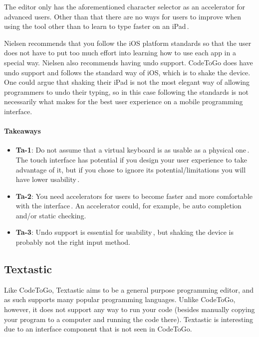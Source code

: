The editor only has the aforementioned character selector as an accelerator for advanced users. Other than that there are no ways for users to improve when using the tool other than to learn to type faster on an iPad\,\cite{nielsen1990heuristic}.

Nielsen recommends that you follow the iOS platform standards so that the user does not have to put too much effort into learning how to use each app in a special way. Nielsen also recommends having undo support. CodeToGo does have undo support and follows the standard way of iOS, which is to shake the device. One could argue that shaking their iPad is not the most elegant way of allowing programmers to undo their typing, so in this case following the standards is not necessarily what makes for the best user experience on a mobile programming interface.

\paragraph{Takeaways}
\begin{itemize}
	\item \textbf{Ta-1}: Do not assume that a virtual keyboard is as usable as a physical one\,\cite{nielsen2013mobile}. The touch interface has potential if you design your user experience to take advantage of it, but if you chose to ignore its potential/limitations you will have lower usability\,\cite{nielsen1990heuristic}.
	\item \textbf{Ta-2}: You need accelerators for users to become faster and more comfortable with the interface\,\cite{nielsen1990heuristic}. An accelerator could, for example, be auto completion and/or static checking.
	\item \textbf{Ta-3}: Undo support is essential for usability\,\cite{nielsen1990heuristic}, but shaking the device is probably not the right input method.
\end{itemize}

\subsection{Textastic}
\label{subsub:Textastic}
Like CodeToGo, Textastic aims to be a general purpose programming editor, and as such supports many popular programming languages. Unlike CodeToGo, however, it does not support any way to run your code (besides manually copying your program to a computer and running the code there). Textastic is interesting due to an interface component that is not seen in CodeToGo.


